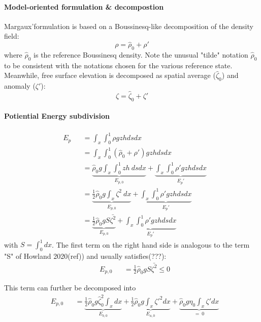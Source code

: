\paragraph{Model-oriented formulation \& decompostion }
Margaux'formulation is based on a Boussinesq-like decomposition of the density field:
\begin{equation}
 \displaystyle
 \rho=\hat{\rho}_{0}+\rho'
\end{equation}
where $\hat{\rho}_{0}$ is the reference Boussinesq density. Note the unusual "tilde" notation $\hat{\rho}_{0}$ to be consistent with the notations chosen for the various reference state.\\
  \color{red}
Meanwhile, free surface elevation is decomposed as spatial average ($\hat{\zeta}_0$) and anomaly ($\zeta'$):
\begin{equation}
 \displaystyle
 \zeta=\hat{\zeta}_{0}+\zeta'
\end{equation}

\paragraph{Potiential Energy subdivision }
\begin{subequations}
\begin{alignat}{2}
&E_p&& = \int_x \int_0^1 \rho g z h ds dx \\
& && = \int_x \int_0^1 ( \hat{\rho}_{0}+\rho') g z h ds dx\\
& && = \underbrace{\hat{\rho}_{0} g \int_x \int_0^1 z h \ ds dx}_{E_{p,0}} + \underbrace{ \int_x \int_0^1 \rho' g z h ds dx}_{E_p'}\\
& && = \underbrace{\frac{1}{2}\hat{\rho}_{0} g \int_x \zeta^2\ dx}_{E_{p,0}} + \underbrace{ \int_x \int_0^1 \rho' g z h ds dx}_{E_p'}\\
& && = \underbrace{\frac{1}{2}\hat{\rho}_{0} g S \bar{\zeta^2}}_{E_{p,0}} + \underbrace{ \int_x \int_0^1 \rho' g z h ds dx}_{E_p'}
\end{alignat}
\end{subequations}
with $S=\int_0^1 dx$. The first term on the right hand side is analogous to the term "S" of Howland 2020(ref)) and usually satisfies(???):
\begin{subequations}
\begin{alignat}{2}
&E_{p,0} &&= \frac{1}{2}\hat{\rho}_{0} g S \bar{\zeta^2}\le 0
\end{alignat}
\end{subequations}

This term can further be decomposed into
\begin{subequations}
\begin{alignat}{2}
& E_{p,0} && = \underbrace{\frac{1}{2} \hat{\rho}_{0} g \hat{\zeta}_0^2 \int_x  dx}_{E_{b,0}} + \underbrace{\frac{1}{2} \hat{\rho}_{0} g \int_x \zeta'^2 dx}_{E_{a,0}} + \underbrace{\hat{\rho}_{0} g \eta_0 \int_x \zeta' dx}_{= \ 0}
\end{alignat}
\end{subequations}


